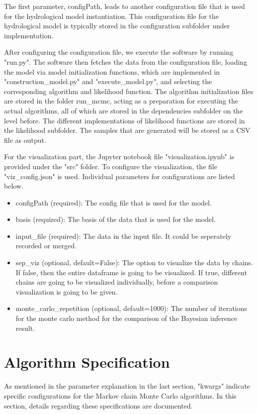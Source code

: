The first parameter, configPath, leads to another configuration file that is used for the hydrological model instantiation. This configuration file for the hydrological model is typically stored in the configuration subfolder under implementation.

After configuring the configuration file, we execute the software by running "run.py". The software then fetches the data from the configuration file, loading the model via model initialization functions, which are implemented in "construction\_model.py" and "execute\_model.py", and selecting the corresponding algorithm and likelihood function. The algorithm initialization files are stored in the folder run\_mcmc, acting as a preparation for executing the actual algorithms, all of which are stored in the dependencies subfolder on the level before. The different implementations of likelihood functions are stored in the likelihood subfolder. The samples that are generated will be stored as a CSV file as output.

For the visualization part, the Jupyter notebook file "visualization.ipynb" is provided under the "src" folder. To configure the visualization, the file "viz\_config.json" is used. Individual parameters for configurations are listed below.

\begin{itemize}
    \item configPath (required): The config file that is used for the model.
    \item basis (required): The basis of the data that is used for the model.
    \item input\_file (required): The data in the input file. It could be seperately recorded or merged.
    \item sep\_viz (optional, default=False): The option to visualize the data by chains. If false, then the entire dataframe is going to be visualized. If true, different chains are going to be visualized individually, before a comparison visualization is going to be given.
    \item monte\_carlo\_repetition (optional, default=1000): The number of iterations for the monte carlo method for the comparison of the Bayesian inference result.
\end{itemize}

\section{Algorithm Specification}
As mentioned in the parameter explanation in the last section, "kwargs" indicate specific configurations for the Markov chain Monte Carlo algorithms. In this section, details regarding these specifications are documented.


